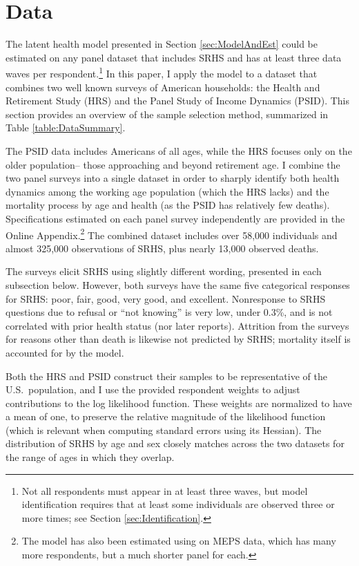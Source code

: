 \documentclass[12pt,pdftex,letterpaper]{article}
\newcommand{\RootDir}{..}
\newcommand{\TablesDir}{\RootDir/Tables}
\begin{document}
\section{Data}\label{sec:Data}

The latent health model presented in Section \ref{sec:ModelAndEst} could be estimated on any panel dataset that includes SRHS and has at least three data waves per respondent.\footnote{Not all respondents must appear in at least three waves, but model identification requires that at least some individuals are observed three or more times; see Section \ref{sec:Identification}.}  In this paper, I apply the model to a dataset that combines two well known surveys of American households: the Health and Retirement Study (HRS) and the Panel Study of Income Dynamics (PSID). This section provides an overview of the sample selection method, summarized in Table \ref{table:DataSummary}.



The PSID data includes Americans of all ages, while the HRS focuses only on the older population-- those approaching and beyond retirement age. I combine the two panel surveys into a single dataset in order to sharply identify both health dynamics among the working age population (which the HRS lacks) and the mortality process by age and health (as the PSID has relatively few deaths). Specifications estimated on each panel survey independently are provided in the Online Appendix.\footnote{The model has also been estimated using on MEPS data, which has many more respondents, but a much shorter panel for each.} The combined dataset includes over 58,000 individuals and almost 325,000 observations of SRHS, plus nearly 13,000 observed deaths.

The surveys elicit SRHS using slightly different wording, presented in each subsection below.  However, both surveys have the same five categorical responses for SRHS: poor, fair, good, very good, and excellent.  Nonresponse to SRHS questions due to refusal or ``not knowing'' is very low, under 0.3\%, and is not correlated with prior health status (nor later reports).  Attrition from the surveys for reasons other than death is likewise not predicted by SRHS; mortality itself is accounted for by the model.

Both the HRS and PSID construct their samples to be representative of the U.S.\ population, and I use the provided respondent weights to adjust contributions to the log likelihood function.  These weights are normalized to have a mean of one, to preserve the relative magnitude of the likelihood function (which is relevant when computing standard errors using its Hessian). The distribution of SRHS by age and sex closely matches across the two datasets for the range of ages in which they overlap.
\end{document}

